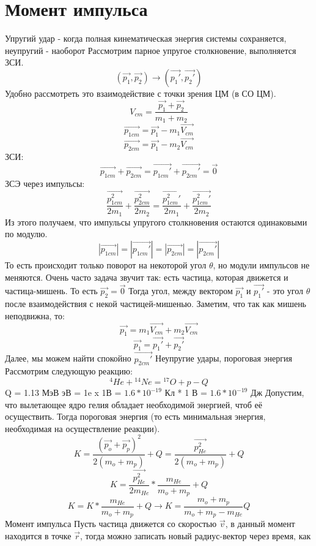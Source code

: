 \section{Момент импульса}
 Упругий удар - когда полная кинематическая энергия системы сохраняется, неупругий - наоборот
Рассмотрим парное упругое столкновение, выполняется ЗСИ.
\[(\Vec{p_1}, \Vec{p_2}) \rightarrow (\Vec{p_1'}, \Vec{p_2'})\]
Удобно рассмотреть это взаимодействие с точки зрения ЦМ (в СО ЦМ).
\[V_{cm} = \frac{\Vec{p_1} + \Vec{p_2}}{m_1 + m_2}\]
\[\Vec{p_{1cm}} = \Vec{p_1} - m_1\Vec{V_{cm}}\]
\[\Vec{p_{2cm}} = \Vec{p_1} - m_2\Vec{V_{cm}}\]
ЗСИ:
\[\Vec{p_{1cm}} + \Vec{p_{2cm}} = \Vec{p_{1cm}'} + \Vec{p_{2cm}'} = \Vec{0}\]
ЗСЭ через импульсы:
\[\frac{\Vec{p_{1cm}^2}}{2m_1} + \frac{\Vec{p_{2cm}^2}}{2m_2} = \frac{\Vec{p_{1cm}^2'}}{2m_1} + \frac{\Vec{p_{1cm}^2'}}{2m_2}\]
Из этого получаем, что импульсы упругого столкновения остаются одинаковыми по модулю.
\[ |\Vec{p_{1cm}}| = |\Vec{p_{1cm}'}| = |\Vec{p_{2cm}}| = |\Vec{p_{2cm}'}|\]
То есть происходит только поворот на некоторой угол $\theta$, но модули импульсов не меняются.
\newline Очень часто задача звучит так: есть частица, которая движется и частица-мишень.
\newline То есть $\Vec{p_2} = \Vec{0}$
\newline Тогда угол, между вектором $\Vec{p_1}$ и $\Vec{p_1'}$ - это угол $\theta$ после взаимодействия с некой частицей-мишенью.
Заметим, что так как мишень неподвижна, то:
\[\Vec{p_1} = m_1\Vec{V_{cm}} + m_2\Vec{V_{cm}}\]
\[\Vec{p_1} = \Vec{p_1'} + \Vec{p_2'}\]
Далее, мы можем найти спокойно $\Vec{p_{2cm}'}$
\newline Неупругие удары, пороговая энергия
\newline Рассмотрим следующую реакцию:
\[ {}^4He + {}^{14}Ne = {}^{17}O + p - Q\] 
Q = 1.13 МэВ
 эВ = 1e x 1В = $1.6 * 10^{-19}$ Кл * 1 В = $1.6 * 10^{-19}$ Дж
\newline Допустим, что вылетающее ядро гелия обладает необходимой энергией, чтоб её осуществить.
Тогда пороговая энергия (то есть минимальная энергия, необходимая на осуществление реакции).
\[K = \frac{(\Vec{p_o} + \Vec{p_p})^2}{2(m_o + m_p)} + Q = \frac{\Vec{p_{He}^2}}{2(m_o + m_p)} + Q\]
\[K = \frac{\Vec{p_{He}^2}}{2m_{He}} * \frac{m_{He}}{m_o + m_p} + Q\]
\[K = K * \frac{m_{He}}{m_o + m_p} + Q \rightarrow K = \frac{m_o + m_p}{m_o + m_p - m_{He}}Q\]
Момент импульса
Пусть частица движется со скоростью $\Vec{v}$, в данный момент находится в точке $\Vec{r}$, тогда можно записать новый радиус-вектор через время, как
